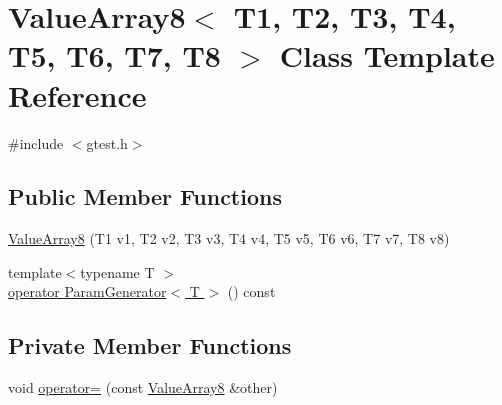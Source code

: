 \hypertarget{classtesting_1_1internal_1_1ValueArray8}{\section{\-Value\-Array8$<$ \-T1, \-T2, \-T3, \-T4, \-T5, \-T6, \-T7, \-T8 $>$ \-Class \-Template \-Reference}
\label{d6/dd6/classtesting_1_1internal_1_1ValueArray8}
}


{\ttfamily \#include $<$gtest.\-h$>$}

\subsection*{\-Public \-Member \-Functions}
\begin{DoxyCompactItemize}
\item 
\hyperlink{classtesting_1_1internal_1_1ValueArray8_a375e0ff3c79c635499e8aa581881f645}{\-Value\-Array8} (\-T1 v1, \-T2 v2, \-T3 v3, \-T4 v4, \-T5 v5, \-T6 v6, \-T7 v7, \-T8 v8)
\item 
{\footnotesize template$<$typename T $>$ }\\\hyperlink{classtesting_1_1internal_1_1ValueArray8_a08ef46fa12c9dd8ef6fc630baeea89b7}{operator Param\-Generator$<$ T $>$} () const 
\end{DoxyCompactItemize}
\subsection*{\-Private \-Member \-Functions}
\begin{DoxyCompactItemize}
\item 
void \hyperlink{classtesting_1_1internal_1_1ValueArray8_a8f1bf43919cbbc05c4ac802bcf96f563}{operator=} (const \hyperlink{classtesting_1_1internal_1_1ValueArray8}{\-Value\-Array8} \&other)
\end{DoxyCompactItemize}
